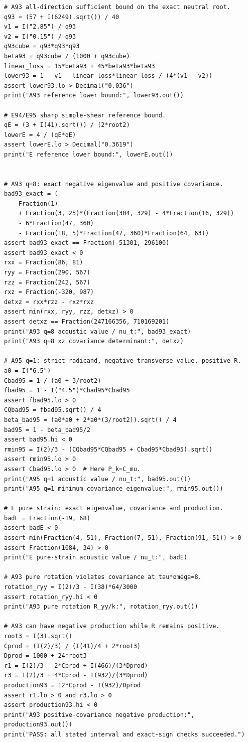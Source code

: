 \documentclass[11pt,a4paper]{article}
\numberwithin{equation}{section}
\begin{document}
\begin{lstlisting}
# A93 all-direction sufficient bound on the exact neutral root.
q93 = (57 + I(6249).sqrt()) / 40
v1 = I("2.85") / q93
v2 = I("0.15") / q93
q93cube = q93*q93*q93
beta93 = q93cube / (1000 + q93cube)
linear_loss = 15*beta93 + 45*beta93*beta93
lower93 = 1 - v1 - linear_loss*linear_loss / (4*(v1 - v2))
assert lower93.lo > Decimal("0.036")
print("A93 reference lower bound:", lower93.out())

# E94/E95 sharp simple-shear reference bound.
qE = (3 + I(41).sqrt()) / (2*root2)
lowerE = 4 / (qE*qE)
assert lowerE.lo > Decimal("0.3619")
print("E reference lower bound:", lowerE.out())


# A93 q=8: exact negative eigenvalue and positive covariance.
bad93_exact = (
    Fraction(1)
    + Fraction(3, 25)*(Fraction(304, 329) - 4*Fraction(16, 329))
    - 6*Fraction(47, 360)
    - Fraction(18, 5)*Fraction(47, 360)*Fraction(64, 63))
assert bad93_exact == Fraction(-51301, 296100)
assert bad93_exact < 0
rxx = Fraction(86, 81)
ryy = Fraction(290, 567)
rzz = Fraction(242, 567)
rxz = Fraction(-320, 987)
detxz = rxx*rzz - rxz*rxz
assert min(rxx, ryy, rzz, detxz) > 0
assert detxz == Fraction(247166356, 710169201)
print("A93 q=8 acoustic value / nu_t:", bad93_exact)
print("A93 q=8 xz covariance determinant:", detxz)

# A95 q=1: strict radicand, negative transverse value, positive R.
a0 = I("6.5")
Cbad95 = 1 / (a0 + 3/root2)
fbad95 = 1 - I("4.5")*Cbad95*Cbad95
assert fbad95.lo > 0
CQbad95 = fbad95.sqrt() / 4
beta_bad95 = (a0*a0 + 2*a0*(3/root2)).sqrt() / 4
bad95 = 1 - beta_bad95/2
assert bad95.hi < 0
rmin95 = I(2)/3 - (CQbad95*CQbad95 + Cbad95*Cbad95).sqrt()
assert rmin95.lo > 0
assert Cbad95.lo > 0  # Here P_k=C_mu.
print("A95 q=1 acoustic value / nu_t:", bad95.out())
print("A95 q=1 minimum covariance eigenvalue:", rmin95.out())

# E pure strain: exact eigenvalue, covariance and production.
badE = Fraction(-19, 68)
assert badE < 0
assert min(Fraction(4, 51), Fraction(7, 51), Fraction(91, 51)) > 0
assert Fraction(1084, 34) > 0
print("E pure-strain acoustic value / nu_t:", badE)

# A93 pure rotation violates covariance at tau*omega=8.
rotation_ryy = I(2)/3 - I(38)*64/3000
assert rotation_ryy.hi < 0
print("A93 pure rotation R_yy/k:", rotation_ryy.out())

# A93 can have negative production while R remains positive.
root3 = I(3).sqrt()
Cprod = (I(2)/3) / (I(41)/4 + 2*root3)
Dprod = 1000 + 24*root3
r1 = I(2)/3 - 2*Cprod + I(466)/(3*Dprod)
r3 = I(2)/3 + 4*Cprod - I(932)/(3*Dprod)
production93 = 12*Cprod - I(932)/Dprod
assert r1.lo > 0 and r3.lo > 0
assert production93.hi < 0
print("A93 positive-covariance negative production:", production93.out())
print("PASS: all stated interval and exact-sign checks succeeded.")
\end{lstlisting}
\end{document}
